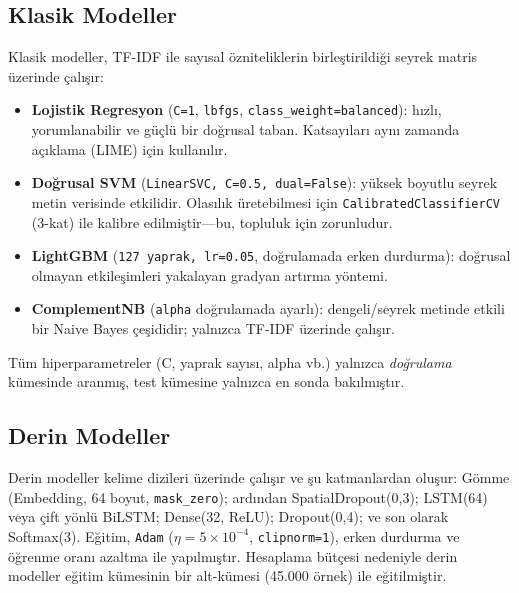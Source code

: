 \documentclass[conference]{IEEEtran}
\begin{document}
\subsection{Klasik Modeller}
Klasik modeller, TF-IDF ile sayısal özniteliklerin birleştirildiği seyrek matris
üzerinde çalışır:
\begin{itemize}
\item \textbf{Lojistik Regresyon} (\texttt{C=1}, \texttt{lbfgs},
\texttt{class\_weight=balanced}): hızlı, yorumlanabilir ve güçlü bir doğrusal
taban. Katsayıları aynı zamanda açıklama (LIME) için kullanılır.
\item \textbf{Doğrusal SVM} (\texttt{LinearSVC, C=0.5, dual=False}): yüksek
boyutlu seyrek metin verisinde etkilidir. Olasılık üretebilmesi için
\texttt{CalibratedClassifierCV} (3-kat) ile kalibre edilmiştir---bu, topluluk
için zorunludur.
\item \textbf{LightGBM} (\texttt{127 yaprak, lr=0.05}, doğrulamada erken durdurma):
doğrusal olmayan etkileşimleri yakalayan gradyan artırma yöntemi.
\item \textbf{ComplementNB} (\texttt{alpha} doğrulamada ayarlı): dengeli/seyrek
metinde etkili bir Naive Bayes çeşididir; yalnızca TF-IDF üzerinde çalışır.
\end{itemize}
Tüm hiperparametreler (C, yaprak sayısı, alpha vb.) yalnızca \emph{doğrulama}
kümesinde aranmış, test kümesine yalnızca en sonda bakılmıştır.

\subsection{Derin Modeller}
Derin modeller kelime dizileri üzerinde çalışır ve şu katmanlardan oluşur: Gömme
(Embedding, 64 boyut, \texttt{mask\_zero}); ardından SpatialDropout(0,3); LSTM(64)
veya çift yönlü BiLSTM; Dense(32, ReLU); Dropout(0,4); ve son olarak Softmax(3).
Eğitim, \texttt{Adam}
($\eta=5\times10^{-4}$, \texttt{clipnorm=1}), erken durdurma ve öğrenme oranı
azaltma ile yapılmıştır. Hesaplama bütçesi nedeniyle derin modeller eğitim
kümesinin bir alt-kümesi (45.000 örnek) ile eğitilmiştir.
\end{document}

